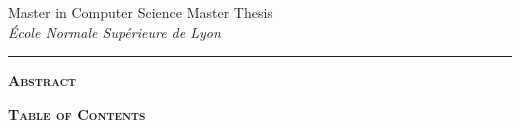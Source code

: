 

{\noindent
  \large
  Master in Computer Science \hfill Master Thesis\\
  \textit{École Normale Supérieure de Lyon}
  \hfill
  \textsc{\theauthor}}

\vspace{4em}

\begin{center}{\LARGE \textbf{\thetitle}}

  \vspace{1.1em}
  \rule{4em}{.1pt}
  \vspace{1.4em}

  \thecredits
\end{center}

\vspace{1.3em}

\begin{center}
  \parbox{0.84\linewidth}{
    \setlength{\parindent}{11.1pt}
    \noindent
    \textsc{\textbf{Abstract}}\\

    \theabstract
  }
\end{center}

\vspace{1.3em}

\begin{center}
  \parbox{0.84\linewidth}{
    \setlength{\parindent}{11.1pt}
    \noindent
    \setcounter{tocdepth}{2}
    \hypersetup{linkcolor=black}
    \textsc{\textbf{Table of Contents}}

    \vspace{-4em}
    \renewcommand\contentsname{}
    \tableofcontents}
\end{center}

\newpage
{}
\restoregeometry